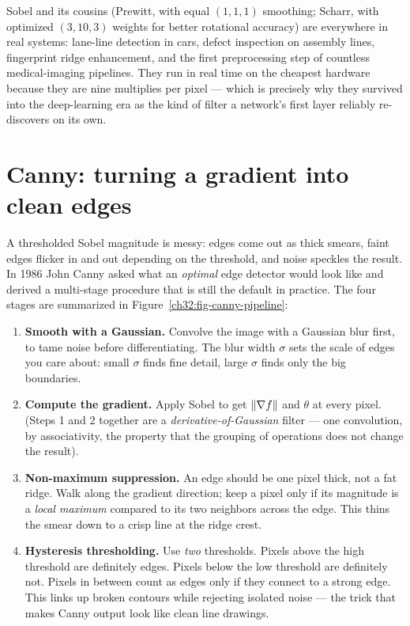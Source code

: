 \begin{applicationbox}
Sobel and its cousins (Prewitt, with equal $(1,1,1)$ smoothing; Scharr, with
optimized $(3,10,3)$ weights for better rotational accuracy) are everywhere in
real systems: lane-line detection in cars, defect inspection on assembly lines,
fingerprint ridge enhancement, and the first preprocessing step of countless
medical-imaging pipelines. They run in real time on the cheapest hardware
because they are nine multiplies per pixel --- which is precisely why they
survived into the deep-learning era as the kind of filter a network's first
layer reliably re-discovers on its own.
\end{applicationbox}

\section{Canny: turning a gradient into clean edges}
\label{ch32:canny}

A thresholded Sobel magnitude is messy: edges come out as thick smears, faint
edges flicker in and out depending on the threshold, and noise speckles the
result. In 1986 John Canny asked what an \emph{optimal} edge detector would
look like and derived a multi-stage procedure that is still the default in
practice. The four stages are summarized in Figure~\ref{ch32:fig-canny-pipeline}:

\begin{enumerate}
\item \textbf{Smooth with a Gaussian.} Convolve the image with a Gaussian blur
first, to tame noise before differentiating. The blur width $\sigma$ sets the
scale of edges you care about: small $\sigma$ finds fine detail, large $\sigma$
finds only the big boundaries.

\item \textbf{Compute the gradient.} Apply Sobel to get $\lVert\nabla f\rVert$ and
$\theta$ at every pixel. (Steps 1 and 2 together are a
\emph{derivative-of-Gaussian} filter --- one convolution, by associativity, the property that the grouping of operations does not change the result).

\item \textbf{Non-maximum suppression.} An edge should be one pixel thick, not
a fat ridge. Walk along the gradient direction; keep a pixel only if its
magnitude is a \emph{local maximum} compared to its two neighbors across the
edge. This thins the smear down to a crisp line at the ridge crest.

\item \textbf{Hysteresis thresholding.} Use \emph{two} thresholds. Pixels above
the high threshold are definitely edges. Pixels below the low threshold are
definitely not. Pixels in between count as edges only if they connect to a
strong edge. This links up broken contours while rejecting isolated noise ---
the trick that makes Canny output look like clean line drawings.
\end{enumerate}

